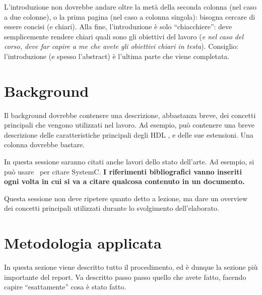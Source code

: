 \documentclass[]{IEEEtran}
\begin{document}
L'introduzione non dovrebbe andare oltre la met\`a della seconda colonna (nel caso a due colonne), o la prima pagina (nel caso a colonna singola): bisogna cercare di essere concisi (e chiari). Alla fine, l'introduzione \`e solo ``chiacchiere'': deve semplicemente rendere chiari quali sono gli obiettivi del lavoro (\emph{e nel caso del corso, deve far capire a me che avete gli obiettivi chiari in testa}). Consiglio: l'introduzione (e spesso l'abstract) \`e l'ultima parte che viene completata.

\section{Background}

Il background dovrebbe contenere una descrizione, abbastanza breve, dei concetti principali che vengono utilizzati nel lavoro. Ad esempio, pu\`o contenere una breve descrizione delle caratteristiche principali degli HDL , e delle sue estensioni. Una colonna dovrebbe bastare.

In questa sessione saranno citati anche lavori dello stato dell'arte. Ad esempio, si pu\`o usare~\cite{SystemC} per citare SystemC. \textbf{I riferimenti bibliografici vanno inseriti ogni volta in cui si va a citare qualcosa contenuto in un documento.}

Questa sessione non deve ripetere quanto detto a lezione, ma dare un overview dei concetti principali utilizzati durante lo svolgimento dell'elaborato.

\section{Metodologia applicata}

In questa sezione viene descritto tutto il procedimento, ed \`e dunque la sezione pi\`u importante del report. Va descritto passo passo quello che avete fatto, facendo capire ``esattamente'' cosa \`e stato fatto.
\end{document}
